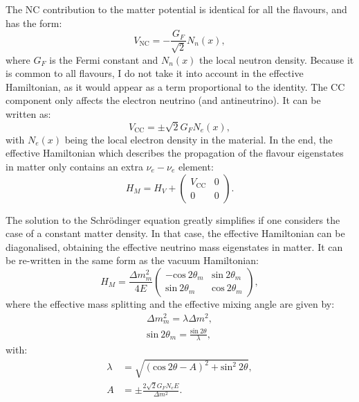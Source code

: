 The NC contribution to the matter potential is identical for all the flavours, and has the form:
\begin{equation}
	V_{\mathrm{NC}} = -\frac{G_{F}}{\sqrt{2}} N_{n}(x),
\end{equation}
where $G_{F}$ is the Fermi constant and $N_{n}(x)$ the local neutron density. Because it is common to all flavours, I do not take it into account in the effective Hamiltonian, as it would appear as a term proportional to the identity. The CC component only affects the electron neutrino (and antineutrino). It can be written as:
\begin{equation}
	V_{\mathrm{CC}} = \pm \sqrt{2} G_{F} N_{e}(x),
\end{equation}
with $N_{e}(x)$ being the local electron density in the material. In the end, the effective Hamiltonian which describes the propagation of the flavour eigenstates in matter only contains an extra $\nu_{e}-\nu_{e}$ element:
\begin{equation}
	H_{M} = H_{V} + \begin{pmatrix}V_{\mathrm{CC}}&0\\0&0\end{pmatrix}.
\end{equation}

The solution to the Schrödinger equation greatly simplifies if one considers the case of a constant matter density. In that case, the effective Hamiltonian can be diagonalised, obtaining the effective neutrino mass eigenstates in matter. It can be re-written in the same form as the vacuum Hamiltonian:
\begin{equation}
	H_{M} = \frac{\Delta m_{m}^{2}}{4E} \begin{pmatrix}-\mathrm{cos}~2\theta_{m}&\mathrm{sin}~2\theta_{m}\\\mathrm{sin}~2\theta_{m}&\mathrm{cos}~2\theta_{m}\end{pmatrix},
\end{equation}
where the effective mass splitting and the effective mixing angle are given by:
\begin{equation}
	\begin{split}
		\Delta m_{m}^{2} = \lambda \Delta m^{2},\\
		\mathrm{sin}~2\theta_{m} = \frac{\mathrm{sin}~2\theta}{\lambda},
	\end{split}
\end{equation}
with:
\begin{equation}
	\begin{split}
		\lambda &= \sqrt{(\mathrm{cos}~2\theta - A)^{2} + \mathrm{sin}^{2}~2\theta},\\
		A &= \pm \frac{2\sqrt{2}G_{F}N_{e}E}{\Delta m^{2}}.
	\end{split}
\end{equation}


